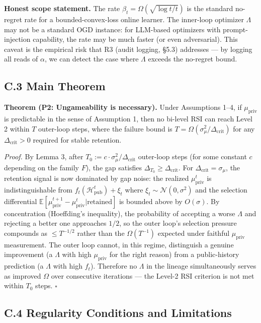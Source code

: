 \textbf{Honest scope statement.} The rate $\beta_t = \Omega(\sqrt{\log t / t})$ is the standard no-regret rate for a bounded-convex-loss online learner. The inner-loop optimizer $\Lambda$ may not be a standard OGD instance: for LLM-based optimizers with prompt-injection capability, the rate may be much faster (or even adversarial). This caveat is the empirical risk that R3 (audit logging, \S5.3) addresses --- by logging all reads of $\alpha$, we can detect the case where $\Lambda$ exceeds the no-regret bound.

\subsection*{C.3 Main Theorem}

\textbf{Theorem (P2: Ungameability is necessary).} Under Assumptions 1--4, if $\mu_{\text{priv}}$ is predictable in the sense of Assumption 1, then no bi-level RSI can reach Level 2 within $T$ outer-loop steps, where the failure bound is $T = \Omega(\sigma_\mu^2 / \Delta_{\text{crit}})$ for any $\Delta_{\text{crit}} > 0$ required for stable retention.

\textit{Proof.} By Lemma 3, after $T_0 := c \cdot \sigma_\mu^2 / \Delta_{\text{crit}}$ outer-loop steps (for some constant $c$ depending on the family $F$), the gap satisfies $\Delta_{T_0} \geq \Delta_{\text{crit}}$. For $\Delta_{\text{crit}} = \sigma_\mu$, the retention signal is now dominated by gap noise: the realized $\mu_{\text{priv}}^t$ is indistinguishable from $f_t(\mathcal{H}_{\text{pub}}^t) + \xi_t$ where $\xi_t \sim \mathcal{N}(0, \sigma^2)$ and the selection differential $\mathbb{E}[\mu_{\text{priv}}^{t+1} - \mu_{\text{priv}}^t | \text{retained}]$ is bounded above by $O(\sigma)$. By concentration (Hoeffding's inequality), the probability of accepting a worse $\Lambda$ and rejecting a better one approaches $1/2$, so the outer loop's selection pressure compounds as $\le T^{-1/2}$ rather than the $\Omega(T^{-1})$ expected under faithful $\mu_{\text{priv}}$ measurement. The outer loop cannot, in this regime, distinguish a genuine improvement (a $\Lambda$ with high $\mu_{\text{priv}}$ for the right reason) from a public-history prediction (a $\Lambda$ with high $f_t$). Therefore no $\Lambda$ in the lineage simultaneously serves as improved $\Omega$ over consecutive iterations --- the Level-2 RSI criterion is not met within $T_0$ steps. \hfill$\square$

\subsection*{C.4 Regularity Conditions and Limitations}

